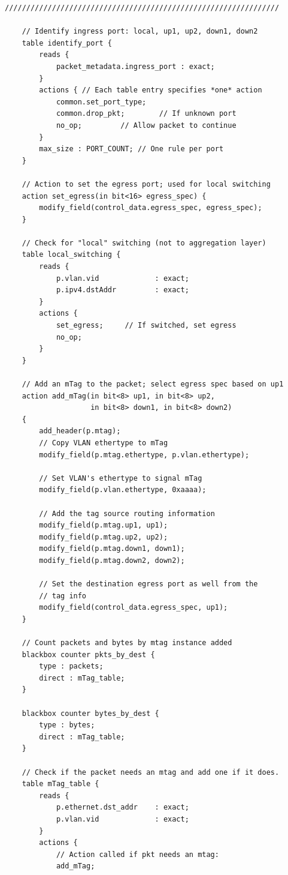 \documentclass[12pt]{article}
\begin{document}
\begin{lstlisting}[style=P4style]
    ////////////////////////////////////////////////////////////////

    // Identify ingress port: local, up1, up2, down1, down2
    table identify_port {
        reads {
            packet_metadata.ingress_port : exact;
        }
        actions { // Each table entry specifies *one* action
            common.set_port_type;
            common.drop_pkt;        // If unknown port
            no_op;         // Allow packet to continue
        }
        max_size : PORT_COUNT; // One rule per port
    }

    // Action to set the egress port; used for local switching
    action set_egress(in bit<16> egress_spec) {
        modify_field(control_data.egress_spec, egress_spec);
    }

    // Check for "local" switching (not to aggregation layer)
    table local_switching {
        reads {
            p.vlan.vid             : exact;
            p.ipv4.dstAddr         : exact;
        }
        actions {
            set_egress;     // If switched, set egress
            no_op;
        }
    }

    // Add an mTag to the packet; select egress spec based on up1
    action add_mTag(in bit<8> up1, in bit<8> up2,
                    in bit<8> down1, in bit<8> down2)
    {
        add_header(p.mtag);
        // Copy VLAN ethertype to mTag
        modify_field(p.mtag.ethertype, p.vlan.ethertype);

        // Set VLAN's ethertype to signal mTag
        modify_field(p.vlan.ethertype, 0xaaaa);

        // Add the tag source routing information
        modify_field(p.mtag.up1, up1);
        modify_field(p.mtag.up2, up2);
        modify_field(p.mtag.down1, down1);
        modify_field(p.mtag.down2, down2);

        // Set the destination egress port as well from the
        // tag info
        modify_field(control_data.egress_spec, up1);
    }

    // Count packets and bytes by mtag instance added
    blackbox counter pkts_by_dest {
        type : packets;
        direct : mTag_table;
    }

    blackbox counter bytes_by_dest {
        type : bytes;
        direct : mTag_table;
    }

    // Check if the packet needs an mtag and add one if it does.
    table mTag_table {
        reads {
            p.ethernet.dst_addr    : exact;
            p.vlan.vid             : exact;
        }
        actions {
            // Action called if pkt needs an mtag:
            add_mTag; 


\end{lstlisting}
\end{document}
